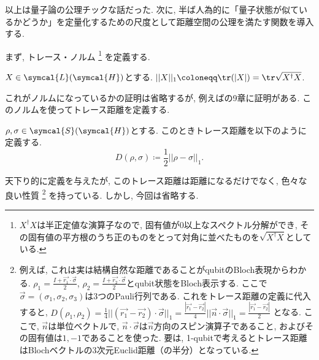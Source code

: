 

以上は量子論の公理チックな話だった. 
次に, 半ば人為的に「量子状態が似ているかどうか」を定量化するための尺度として距離空間の公理を満たす関数を導入する. 

まず, トレース・ノルム
\footnote{$X^{\dag}X$は半正定値な演算子なので, 固有値が0以上なスペクトル分解ができ, その固有値の平方根のうち正のものをとって対角に並べたものを$\sqrt{X^\dag X}$としている. }
を定義する. 
\begin{mydfn}\label{dfn.trace_norm}
$X\in\symcal{L}(\symcal{H})$とする. 
$||X||_1\coloneqq \tr (|X|)=\tr\sqrt{X^\dag X}$. 
\end{mydfn}
これがノルムになっているかの証明は省略するが, 例えば\cite{nielsen2010quantum}の9章に証明がある. 
このノルムを使ってトレース距離を定義する. 

\begin{mydfn}[トレース距離]
  $\rho, \sigma\in\symcal{S}(\symcal{H})$とする. 
  このときトレース距離を以下のように定義する. 
  \begin{equation}
    D(\rho, \sigma)\coloneqq \frac{1}{2}||\rho-\sigma||_1. 
  \end{equation}
\end{mydfn}

天下り的に定義を与えたが, このトレース距離は距離になるだけでなく, 色々な良い性質
\footnote{例えば, これは実は結構自然な距離であることがqubitのBloch表現からわかる. 
$\rho_1=\frac{I+\vec{r_1}\cdot\vec{\sigma}}{2}$, $\rho_2=\frac{I+\vec{r_2}\cdot\vec{\sigma}}{2}$とqubit状態をBloch表示する. 
ここで$\vec{\sigma}=(\sigma_1,\sigma_2,\sigma_3)$は3つのPauli行列である. 
これをトレース距離の定義に代入すると, 
$D(\rho_1,\rho_2)=\frac{1}{4}||(\vec{r_1}-\vec{r_2})\cdot\vec{\sigma}||_1=\frac{|\vec{r_1}-\vec{r_2}|}{4}||\vec{n}\cdot\vec{\sigma}||_1=\frac{|\vec{r_1}-\vec{r_2}|}{2}$
となる. 
ここで, $\vec{n}$は単位ベクトルで, $\vec{n}\cdot\vec{\sigma}$は$\vec{n}$方向のスピン演算子であること, およびその固有値は$1, -1$であることを使った. 
要は, 1-qubitで考えるとトレース距離はBlochベクトルの3次元Euclid距離（の半分）となっている. }
を持っている. 
しかし, 今回は省略する. 
